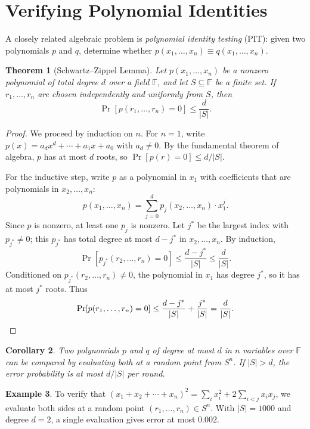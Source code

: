 \documentclass[twoside,12pt]{book}
\theoremstyle{plain}
\newtheorem{theorem}{Theorem}[chapter]
\newtheorem{corollary}[theorem]{Corollary}
\theoremstyle{definition}
\newtheorem{example}[theorem]{Example}
\theoremstyle{remark}
\begin{document}
\section{Verifying Polynomial Identities}
\label{sec:poly-identity}

A closely related algebraic problem is \emph{polynomial identity testing} (PIT): given two polynomials $p$ and $q$, determine whether $p(x_1, \ldots, x_n) \equiv q(x_1, \ldots, x_n)$.

\begin{theorem}[Schwartz--Zippel Lemma]
\label{thm:schwartz-zippel}
Let $p(x_1, \ldots, x_n)$ be a nonzero polynomial of total degree $d$ over a field $\mathbb{F}$, and let $S \subseteq \mathbb{F}$ be a finite set. If $r_1, \ldots, r_n$ are chosen independently and uniformly from $S$, then
\[
\Pr[p(r_1, \ldots, r_n) = 0] \leq \frac{d}{|S|}.
\]
\end{theorem}

\begin{proof}
We proceed by induction on $n$. For $n = 1$, write $p(x) = a_d x^d + \cdots + a_1 x + a_0$ with $a_d \neq 0$. By the fundamental theorem of algebra, $p$ has at most $d$ roots, so $\Pr[p(r) = 0] \leq d/|S|$.

For the inductive step, write $p$ as a polynomial in $x_1$ with coefficients that are polynomials in $x_2, \ldots, x_n$:
\[
p(x_1, \ldots, x_n) = \sum_{j=0}^{d} p_j(x_2, \ldots, x_n) \cdot x_1^j.
\]
Since $p$ is nonzero, at least one $p_j$ is nonzero. Let $j^*$ be the largest index with $p_{j^*} \neq 0$; this $p_{j^*}$ has total degree at most $d - j^*$ in $x_2, \ldots, x_n$. By induction,
\[
\Pr[p_{j^*}(r_2, \ldots, r_n) = 0] \leq \frac{d - j^*}{|S|} \leq \frac{d}{|S|}.
\]
Conditioned on $p_{j^*}(r_2, \ldots, r_n) \neq 0$, the polynomial in $x_1$ has degree $j^*$, so it has at most $j^*$ roots. Thus
\[
\Pr[p(r_1, \ldots, r_n) = 0] \leq \frac{d - j^*}{|S|} + \frac{j^*}{|S|} = \frac{d}{|S|}.\qedhere
\]
\end{proof}

\begin{corollary}
\label{cor:pit}
Two polynomials $p$ and $q$ of degree at most $d$ in $n$ variables over $\mathbb{F}$ can be compared by evaluating both at a random point from $S^n$. If $|S| > d$, the error probability is at most $d/|S|$ per round.
\end{corollary}

\begin{example}
To verify that $(x_1 + x_2 + \cdots + x_n)^2 = \sum_{i} x_i^2 + 2\sum_{i < j} x_i x_j$, we evaluate both sides at a random point $(r_1, \ldots, r_n) \in S^n$. With $|S| = 1000$ and degree $d = 2$, a single evaluation gives error at most $0.002$.
\end{example}
\end{document}
